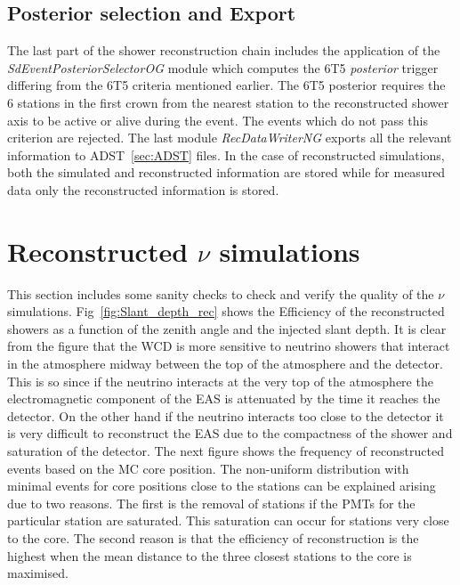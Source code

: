 
\subsection{Posterior selection and Export}
\label{subsec:reco_possel}

The last part of the shower reconstruction chain includes the application of the \textit{SdEventPosteriorSelectorOG} module which computes the 6T5 \textit{posterior} trigger differing from the 6T5 criteria mentioned earlier. The 6T5 posterior requires the 6 stations in the first crown from the nearest station to the reconstructed shower axis to be active or alive during the event. The events which do not pass this criterion are rejected. The last module \textit{RecDataWriterNG} exports all the relevant information to ADST~\ref{sec:ADST} files. In the case of reconstructed simulations, both the simulated and reconstructed information are stored while for measured data only the reconstructed information is stored.

\section{Reconstructed \texorpdfstring{$\nu$}{} simulations}
\label{sec:reco_possel}
This section includes some sanity checks to check and verify the quality of the $\nu$ simulations. Fig~\ref{fig:Slant_depth_rec} shows the Efficiency of the reconstructed showers as a function of the zenith angle and the injected slant depth. It is clear from the figure that the WCD is more sensitive to neutrino showers that interact in the atmosphere midway between the top of the atmosphere and the detector. This is so since if the neutrino interacts at the very top of the atmosphere the electromagnetic component of the EAS is attenuated by the time it reaches the detector. On the other hand if the neutrino interacts too close to the detector it is very difficult to reconstruct the EAS due to the compactness of the shower and saturation of the detector. The next figure shows the frequency of reconstructed events based on the MC core position. The non-uniform distribution with minimal events for core positions close to the stations can be explained arising due to two reasons. The first is the removal of stations if the PMTs for the particular station are saturated. This saturation can occur for stations very close to the core. The second reason is that the efficiency of reconstruction is the highest when the mean distance to the three closest stations to the core is maximised.

